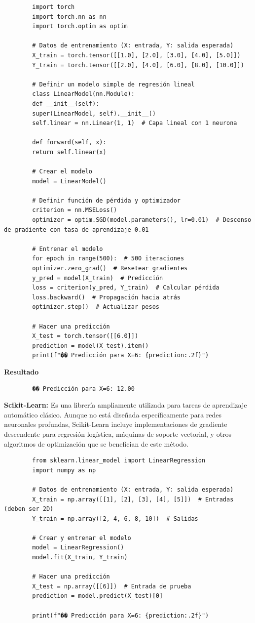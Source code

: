 \documentclass{article}
\begin{document}
	\begin{verbatim}
		import torch
		import torch.nn as nn
		import torch.optim as optim
		
		# Datos de entrenamiento (X: entrada, Y: salida esperada)
		X_train = torch.tensor([[1.0], [2.0], [3.0], [4.0], [5.0]])
		Y_train = torch.tensor([[2.0], [4.0], [6.0], [8.0], [10.0]])
		
		# Definir un modelo simple de regresión lineal
		class LinearModel(nn.Module):
		def __init__(self):
		super(LinearModel, self).__init__()
		self.linear = nn.Linear(1, 1)  # Capa lineal con 1 neurona
		
		def forward(self, x):
		return self.linear(x)
		
		# Crear el modelo
		model = LinearModel()
		
		# Definir función de pérdida y optimizador
		criterion = nn.MSELoss()
		optimizer = optim.SGD(model.parameters(), lr=0.01)  # Descenso de gradiente con tasa de aprendizaje 0.01
		
		# Entrenar el modelo
		for epoch in range(500):  # 500 iteraciones
		optimizer.zero_grad()  # Resetear gradientes
		y_pred = model(X_train)  # Predicción
		loss = criterion(y_pred, Y_train)  # Calcular pérdida
		loss.backward()  # Propagación hacia atrás
		optimizer.step()  # Actualizar pesos
		
		# Hacer una predicción
		X_test = torch.tensor([[6.0]])
		prediction = model(X_test).item()
		print(f"�� Predicción para X=6: {prediction:.2f}")
	\end{verbatim}
	
	\textbf{Resultado}
	\begin{verbatim}
		�� Predicción para X=6: 12.00
	\end{verbatim}
	
	\textbf{Scikit-Learn:} Es una librería ampliamente utilizada para tareas de aprendizaje automático clásico. Aunque no está diseñada específicamente para redes neuronales profundas, Scikit-Learn incluye implementaciones de gradiente descendente para regresión logística, máquinas de soporte vectorial, y otros algoritmos de optimización que se benefician de este método.
	
	\begin{verbatim}
		from sklearn.linear_model import LinearRegression
		import numpy as np
		
		# Datos de entrenamiento (X: entrada, Y: salida esperada)
		X_train = np.array([[1], [2], [3], [4], [5]])  # Entradas (deben ser 2D)
		Y_train = np.array([2, 4, 6, 8, 10])  # Salidas
		
		# Crear y entrenar el modelo
		model = LinearRegression()
		model.fit(X_train, Y_train)
		
		# Hacer una predicción
		X_test = np.array([[6]])  # Entrada de prueba
		prediction = model.predict(X_test)[0]
		
		print(f"�� Predicción para X=6: {prediction:.2f}")
	\end{verbatim}
	
\end{document}

